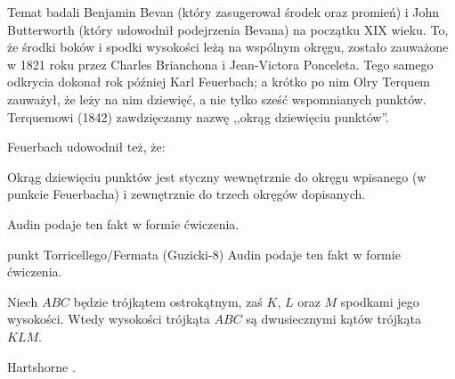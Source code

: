 Temat badali Benjamin Bevan (który zasugerował środek oraz promień) i John Butterworth (który udowodnił podejrzenia Bevana) na początku XIX wieku.
%
%
To, że środki boków i spodki wysokości leżą na wspólnym okręgu, zostało zauważone w 1821 roku przez Charles Brianchona i Jean-Victora Ponceleta.
%
%
Tego samego odkrycia dokonał rok później Karl Feuerbach; a krótko po nim Olry Terquem zauważył, że leży na nim dziewięć, a nie tylko sześć wspomnianych punktów.
%
%
Terquemowi (1842) zawdzięczamy nazwę ,,okrąg dziewięciu punktów''.

Feuerbach udowodnił też, że:

\begin{theorem}[Feuerbacha]
\label{punkt_feuerbacha}%
	Okrąg dziewięciu punktów jest styczny wewnętrznie do okręgu wpisanego (w punkcie Feuerbacha) i zewnętrznie do trzech okręgów dopisanych.
\end{theorem}

Audin \cite[s. 110]{audin_2003} podaje ten fakt w formie ćwiczenia.

punkt Torricellego/Fermata (Guzicki-8)
Audin \cite[s. 105]{audin_2003} podaje ten fakt w formie ćwiczenia.

\begin{proposition}
	\label{orthic_triangle}
	Niech $ABC$ będzie trójkątem ostrokątnym, zaś $K$, $L$ oraz $M$ spodkami jego wysokości.
	Wtedy wysokości trójkąta $ABC$ są dwusiecznymi kątów trójkąta $KLM$.
\end{proposition}

Hartshorne \cite[s. 58]{hartshorne2000}.

%